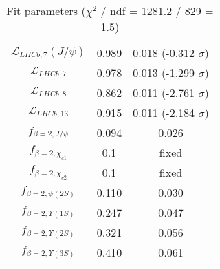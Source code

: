 \begin{table}[h!]
\begin{tabular}{c|c|c}
$\mathcal L_{LHCb,7}(J/\psi)$ & 0.989 & 0.018 (-0.312 $\sigma$) \\
$\mathcal L_{LHCb,7}$ & 0.978 & 0.013 (-1.299 $\sigma$) \\
$\mathcal L_{LHCb,8}$ & 0.862 & 0.011 (-2.761 $\sigma$) \\
$\mathcal L_{LHCb,13}$ & 0.915 & 0.011 (-2.184 $\sigma$) \\
$f_{\beta=2,J/\psi}$ & 0.094 & 0.026 \\
$f_{\beta=2,\chi_{c1}}$ & 0.1 & fixed \\
$f_{\beta=2,\chi_{c2}}$ & 0.1 & fixed \\
$f_{\beta=2,\psi(2S)}$ & 0.110 & 0.030 \\
$f_{\beta=2,\Upsilon(1S)}$ & 0.247 & 0.047 \\
$f_{\beta=2,\Upsilon(2S)}$ & 0.321 & 0.056 \\
$f_{\beta=2,\Upsilon(3S)}$ & 0.410 & 0.061 \\
\end{tabular}
\caption{Fit parameters ($\chi^2$ / ndf = 1281.2 / 829 = 1.5)}
\end{table}
